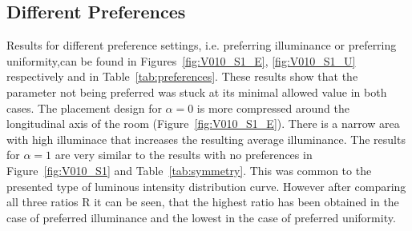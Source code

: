 \subsection{Different Preferences}

Results for different preference settings, i.e. preferring illuminance or preferring uniformity,can be found in Figures~\ref{fig:V010_S1_E}, \ref{fig:V010_S1_U} respectively and in Table~\ref{tab:preferences}. These results show that the parameter not being preferred was stuck at its minimal allowed value in both cases. The placement design for $\alpha = 0$ is more compressed around the longitudinal axis of the room (Figure~\ref{fig:V010_S1_E}). There is a narrow area with high illuminace that increases the resulting average illuminance. The results for $\alpha = 1$ are very similar to the results with no preferences in Figure~\ref{fig:V010_S1} and Table~\ref{tab:symmetry}. This was common to the presented type of luminous intensity distribution curve. However after comparing all three ratios R it can be seen, that the highest ratio has been obtained in the case of preferred illuminance and the lowest in the case of preferred uniformity.

